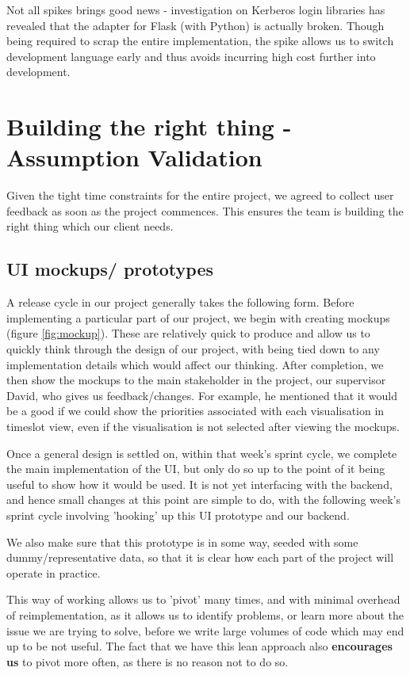 \documentclass[a4paper]{article}
\begin{document}
Not all spikes brings good news - investigation on Kerberos login libraries has
revealed that the adapter for Flask (with Python) is actually broken.
Though being required to scrap the entire implementation, the spike allows us
to switch development language early and thus avoids incurring high 
cost further into development.

\section{Building the right thing - Assumption Validation}
Given the tight time constraints for the entire project, we agreed to collect
user feedback as soon as the project commences. This ensures the team
is building the right thing which our client needs.

\subsection{UI mockups/ prototypes}
A release cycle in our project generally takes the following form. Before
 implementing a particular part of our project, we begin with creating
 mockups (figure \ref{fig:mockup}). These are relatively quick to produce
 and allow us to quickly think through the design of our project,
 with being tied down to any implementation details which would affect
 our thinking. After completion, we then show the mockups to the main
 stakeholder in the project, our supervisor David, who gives us
 feedback/changes. For example, he mentioned that it would be a good if we could 
show the priorities associated with each visualisation in timeslot view, 
even if the visualisation is not selected after viewing the mockups.

Once a general design is settled on, within that week's
sprint cycle, we complete the main implementation of the UI, but only do 
so up to the point of it being useful to show how it would be used. It is
not yet interfacing with the backend, and hence small changes at this 
point are simple to do, with the following week's sprint cycle involving
'hooking' up this UI prototype and our backend.

We also make sure that this prototype is in some way, seeded with some
dummy/representative data, so that it is clear how each part of the project
will operate in practice.

This way of working allows us to 'pivot' many times, and with minimal overhead
of reimplementation, as it allows us to identify problems, or learn more about
the issue we are trying to solve, before we write large volumes of code which
may end up to be not useful. The fact that we have this lean approach also
\textbf{encourages us} to pivot more often, as there is no reason not to do so.
\end{document}
